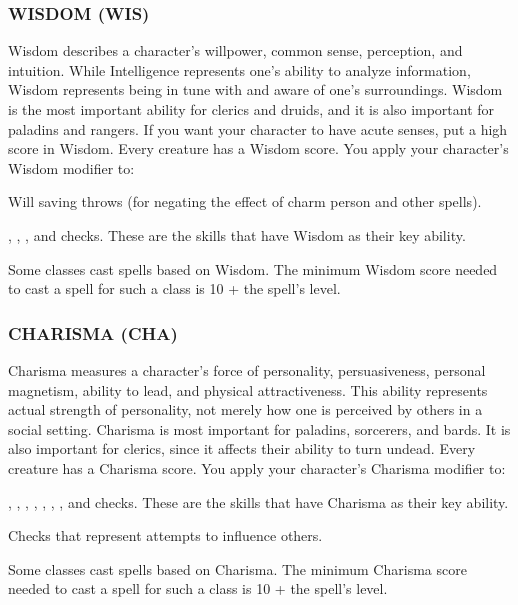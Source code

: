 \subsubsection{WISDOM (WIS)}

Wisdom describes a character's willpower, common sense, perception, and intuition. While Intelligence represents one's ability to analyze information, Wisdom represents being in tune with and aware of one's surroundings. Wisdom is the most important ability for clerics and druids, and it is also important for paladins and rangers. If you want your character to have acute senses, put a high score in Wisdom. Every creature has a Wisdom score.
You apply your character's Wisdom modifier to:
\begin{itemize*}
	\item Will saving throws (for negating the effect of charm person and other spells).
	\item {}, , , and  checks. These are the skills that have Wisdom as their key ability.
	\item Some classes cast spells based on Wisdom.  The minimum Wisdom score needed to cast a spell for such a class is 10 + the spell's level.
\end{itemize*}

\subsubsection{CHARISMA (CHA)}

Charisma measures a character's force of personality, persuasiveness, personal magnetism, ability to lead, and physical attractiveness. This ability represents actual strength of personality, not merely how one is perceived by others in a social setting. Charisma is most important for paladins, sorcerers, and bards. It is also important for clerics, since it affects their ability to turn undead. Every creature has a Charisma score.
You apply your character's Charisma modifier to:
\begin{itemize*}
	\item {}, , , , , , , and  checks. These are the skills that have Charisma as their key ability.
	\item Checks that represent attempts to influence others.
	\item Some classes cast spells based on Charisma.  The minimum Charisma score needed to cast a spell for such a class is 10 + the spell's level.
\end{itemize*}

\vspace*{15pt}